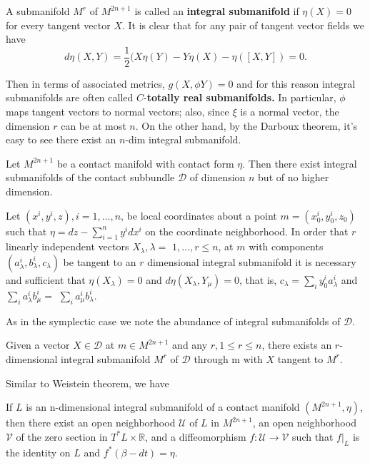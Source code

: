 \begin{definition}
    A submanifold $M^r$ of $M^{2 n+1}$ is called an \textbf{integral submanifold} if $\eta(X)=0$ for every tangent vector $X$. It is clear that for any pair of tangent vector fields we have
$$
d \eta(X, Y)=\frac{1}{2}(X \eta(Y)-Y \eta(X)-\eta([X, Y])=0 .
$$

Then in terms of associated metrics, $g(X, \phi Y)=0$ and for this reason integral submanifolds are often called $C$-\textbf{totally real submanifolds.} In particular, $\phi$ maps tangent vectors to normal vectors; also, since $\xi$ is a normal vector, the dimension $r$ can be at most $n$. On the other hand, by the Darboux theorem, it's easy to see there exist an $n$-dim integral submanifold.
\end{definition}

\begin{theorem}
    Let $M^{2n+1}$ be a contact manifold with contact form $\eta$. Then there exist integral submanifolds of the contact subbundle $\mathcal{D}$ of dimension $n$ but of no higher dimension.
\end{theorem}

\begin{theorem}[Sasaki, 1964]
     Let $\left(x^i, y^i, z\right), i=1, \ldots, n$, be local coordinates about a point $m=\left(x_0^i,  y_0^i, z_0\right)$ such that $\eta=d z-\sum_{i=1}^n y^i d x^i$ on the coordinate neighborhood. In order that $r$ linearly independent vectors $X_\lambda, \lambda=$ $1, \ldots, r \leq n$, at $m$ with components $\left(a_\lambda^i, b_\lambda^i, c_\lambda\right)$ be tangent to an $r$ dimensional integral submanifold it is necessary and sufficient that $\eta\left(X_\lambda\right)=0$ and $d \eta\left(X_\lambda, Y_\mu\right)=0$, that is, $c_\lambda=\sum_i y_0^i a_\lambda^i$ and $\sum_i a_\lambda^i b_\mu^i=$ $\sum_i a_\mu^i b_\lambda^i$.
\end{theorem}

As in the symplectic case we note the abundance of integral submanifolds of $\mathcal{D}$.

\begin{theorem}[Sasaki, 1964]
    Given a vector $X \in \mathcal{D}$ at $m \in M^{2n+1}$ and any $r, 1 \leq r \leq n$, there exists an $r$-dimensional integral submanifold $M^r$ of $\mathcal{D}$ through m with $X$ tangent to $M^r$.
\end{theorem}

Similar to Weistein theorem, we have 
\begin{theorem}[Lychagin, 1977]
     If $L$ is an n-dimensional integral submanifold of a contact manifold $\left(M^{2 n+1}, \eta\right)$, then there exist an open neighborhood $\mathcal{U}$ of $L$ in $M^{2 n+1}$, an open neighborhood $\mathcal{V}$ of the zero section in $T^* L \times \mathbb{R}$, and a diffeomorphism $f: \mathcal{U} \longrightarrow \mathcal{V}$ such that $\left.f\right|_L$ is the identity on $L$ and $f^*(\beta-d t)=\eta$.
\end{theorem}


